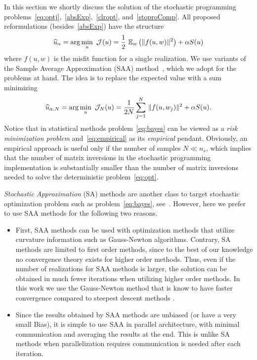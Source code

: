 \documentclass[12pt]{article}
\newcommand{\hf}{\frac12}
\newcommand{\bbE}{\mathbb{E}}
\begin{document}
In this section we shortly discuss the solution of the stochastic programming problems~\eqref{eq:optj},~\eqref{absExp},~\eqref{clropt}, and~\eqref{stoproComp}. All proposed reformulations (besides~\eqref{absExp}) have the structure
\begin{equation} \label{eq:bayes}
\widehat u_{\alpha} = 	{\rm arg}\min_{u}\  {\cal J}(u) = \hf\ \bbE_{w} \left( \|f(u,w)\|^{2} \right) + \alpha S(u)
\end{equation}
where $f(u,w)$ is the misfit function for a single realization.
We use variants of the Sample Average Approximation (SAA) method~\cite{LinderothShapiroWright2006}, which we adopt for the problems at hand. The idea is to replace the expected value with a sum minimizing
\begin{equation} \label{eq:empirical}
\widehat u_{\alpha,N} = 	{\rm arg}\min_{u}\ {\cal J}_{N}(u) = {\frac 1 {2N}} \sum_{j = 1}^N \, \|f(u,w_{j})\|^{2} + \alpha S(u).
\end{equation}
Notice that in statistical methods problem~\eqref{eq:bayes} can be viewed as a \emph{risk minimization problem} and~\eqref{eq:empirical} as its \emph{empirical} pendant.
Obviously, an empirical approach is useful only if the number of samples $N \ll n_{s}$, which implies that the number of matrix inversions in the stochastic programming implementation is substantially smaller than the number of matrix inversions needed to solve the deterministic problem~\eqref{eq:opt}.

\emph{Stochastic Approximation} (SA) methods are another class to target stochastic optimization problem such as problem~\eqref{eq:bayes}, see~\cite{JuditskyLanNemirovskiShapiro2009}. However, here we prefer to use SAA methods for the following two reasons.
\begin{itemize}
\item First, SAA methods can be used with optimization methods that utilize curvature information such as Gauss-Newton algorithms. Contrary, SA methods are limited to first order methods, since to the best of our knowledge no convergence theory exists for higher order methods. Thus, even if the number of realizations for SAA methods is larger, the solution can be obtained in much fewer iterations when utilizing higher order methods. In this work we use the Gauss-Newton method that is know to have faster convergence compared to steepest descent methods \cite{pratt1999,hao}.
\item Since the results obtained by SAA methods are unbiased (or have a very small Bias), it is simple to use SAA in parallel architecture, with minimal communication and averaging the results at the end. This is unlike SA methods when parallelization requires communication is needed after each iteration.
\end{itemize}
\end{document}
